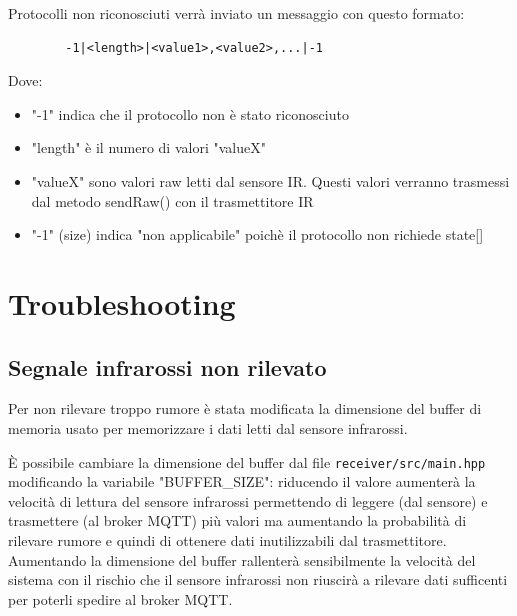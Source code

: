 \documentclass[a4paper,11pt]{article}
\begin{document}
    \bigskip

    \begin{samepage}
      Protocolli non riconosciuti verrà inviato un messaggio con questo formato:

      \begin{verbatim}
        -1|<length>|<value1>,<value2>,...|-1
      \end{verbatim}

      Dove:
      \begin{itemize}
          \item "-1" indica che il protocollo non è stato riconosciuto
          \item "length" è il numero di valori "valueX"
          \item "valueX" sono valori raw letti dal sensore IR. Questi valori verranno trasmessi dal metodo sendRaw() con il trasmettitore IR
          \item "-1" (size) indica "non applicabile" poichè il protocollo non richiede state[]
      \end{itemize}
    \end{samepage}

\section{Troubleshooting}

    \subsection{Segnale infrarossi non rilevato}

    Per non rilevare troppo rumore è stata modificata la dimensione del buffer di memoria usato per memorizzare i dati letti dal sensore infrarossi.

    È possibile cambiare la dimensione del buffer dal file \texttt{receiver/src/main.hpp} modificando la variabile "BUFFER\_SIZE": riducendo il valore aumenterà la velocità di lettura 
    del sensore infrarossi permettendo di leggere (dal sensore) e trasmettere (al broker MQTT) più valori ma aumentando la probabilità di rilevare rumore e quindi di ottenere dati inutilizzabili dal trasmettitore.
    Aumentando la dimensione del buffer rallenterà sensibilmente la velocità del sistema con il rischio che il sensore infrarossi non riuscirà a rilevare dati sufficenti per poterli spedire al broker MQTT.

\clearpage

\listoffigures
{}
\end{document}

